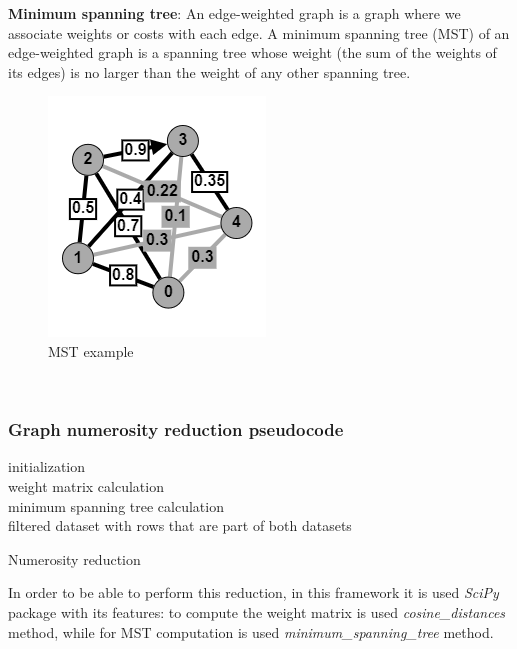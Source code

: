 \documentclass[\main/main.tex]{subfiles}
\begin{document}
\textbf{Minimum spanning tree}: An edge-weighted graph is a graph where we associate weights or costs with each edge. A minimum spanning tree (MST) of an edge-weighted graph is a spanning tree whose weight (the sum of the weights of its edges) is no larger than the weight of any other spanning tree.
\begin{center}
    \begin{figure}[h]
    \centering
    \includegraphics[scale=1.25]{images/methods/mst_example.png}
    \caption{MST example}
    \label{fig:mst_example}
\end{figure}
\end{center}
\cite{books/daglib/0029345}\\
\subsubsection{Graph numerosity reduction pseudocode}
\begin{center}
    \begin{algorithm}[H]
     initialization\\
     weight matrix calculation\\
     minimum spanning tree calculation\\
     \Return filtered dataset with rows that are part of both datasets
     \caption{Numerosity reduction}
    \end{algorithm}
\end{center}
In order to be able to perform this reduction, in this framework it is used \textit{SciPy} \cite{2020SciPyNMeth} package with its features: to compute the weight matrix is used \textit{cosine\_distances} method, while for MST computation is used \textit{minimum\_spanning\_tree} method.
\end{document}
